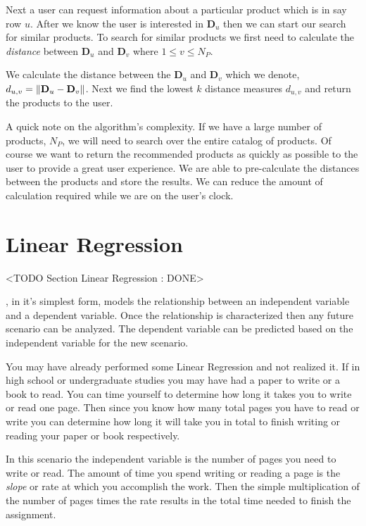 Next a user can request information about a particular product which is in say row $u$. After we know the user is interested in $\mathbf{D}_u$ then we can start our search for similar products. To search for similar products we first need to calculate the \emph{distance} between $\mathbf{D}_u$ and $\mathbf{D}_v$ where $1 \leq v \leq N_P$. 

We calculate the distance between the $\mathbf{D}_u$ and $\mathbf{D}_v$ which we denote, $d_{u,v} = \| \mathbf{D}_u-\mathbf{D}_v \|$. Next we find the lowest $k$ distance measures $d_{u,v}$ and return the products to the user. 

A quick note on the algorithm's complexity. If we have a large number of products, $N_P$, we will need to search over the entire catalog of products. Of course we want to return the recommended products as quickly as possible to the user to provide a great user experience. We are able to pre-calculate the distances between the products and store the results. We can reduce the amount of calculation required while we are on the user's clock. 
	
\section{Linear Regression}
	<TODO Section Linear Regression : DONE>
	
, in it's simplest form, models the relationship between an independent variable and a dependent variable. Once the relationship is characterized then any future scenario can be analyzed. The dependent variable can be predicted based on the independent variable for the new scenario. 

You may have already performed some Linear Regression and not realized it. If in high school or undergraduate studies you may have had a paper to write or a book to read. You can time yourself to determine how long it takes you to write or read one page. Then since you know how many total pages you have to read or write you can determine how long it will take you in total to finish writing or reading your paper or book respectively. 

In this scenario the independent variable is the number of pages you need to write or read. The amount of time you spend writing or reading a page is the \emph{slope} or rate at which you accomplish the work. Then the simple multiplication of the number of pages times the rate results in the total time needed to finish the assignment. 

